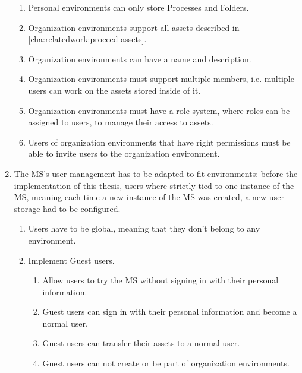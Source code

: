 \begin{enumerate}
\begin{enumerate}
		      \item Personal environments can only store Processes and Folders.

		      \item Organization environments support all assets described in \ref{cha:relatedwork:proceed-assets}.

		      \item Organization environments can have a name and description.

		      \item Organization environments must support multiple members, i.e. multiple users can
		            work on the assets stored inside of it.

		      \item Organization environments must have a role system, where roles can be assigned to
		            users, to manage their access to assets.

		      \item Users of organization environments that have right permissions must be able to invite users
		            to the organization environment.
	      \end{enumerate}


	\item The MS's user management has to be adapted to fit environments: before the
	      implementation of this thesis, users where strictly tied to one instance of the MS,
	      meaning each time a new instance of the MS was created, a new user storage had to be
	      configured.
	      \begin{enumerate}
		      \item Users have to be global, meaning that they don't belong to any environment.

		      \item Implement Guest users.
		            \begin{enumerate}
			            \item Allow users to try the MS without signing in with their personal
			                  information.
			            \item Guest users can sign in with their personal information and become a normal
			                  user.
			            \item Guest users can transfer their assets to a normal user.

			            \item Guest users can not create or be part of organization environments.
		            \end{enumerate}


\end{enumerate}
\end{enumerate}
